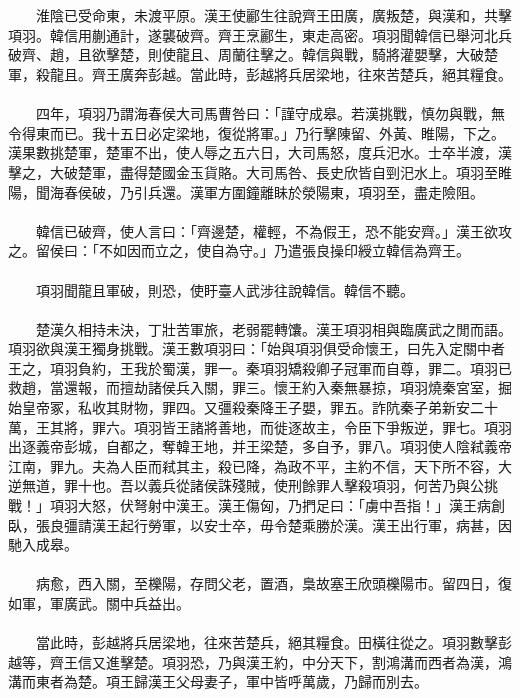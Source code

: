 \\\\
　　淮陰已受命東，未渡平原。漢王使酈生往說齊王田廣，廣叛楚，與漢和，共擊項羽。韓信用蒯通計，遂襲破齊。齊王烹酈生，東走高密。項羽聞韓信已舉河北兵破齊、趙，且欲擊楚，則使龍且、周蘭往擊之。韓信與戰，騎將灌嬰擊，大破楚軍，殺龍且。齊王廣奔彭越。當此時，彭越將兵居梁地，往來苦楚兵，絕其糧食。
\\\\
　　四年，項羽乃謂海春侯大司馬曹咎曰：「謹守成皋。若漢挑戰，慎勿與戰，無令得東而已。我十五日必定梁地，復從將軍。」乃行擊陳留、外黃、睢陽，下之。漢果數挑楚軍，楚軍不出，使人辱之五六日，大司馬怒，度兵汜水。士卒半渡，漢擊之，大破楚軍，盡得楚國金玉貨賂。大司馬咎、長史欣皆自剄汜水上。項羽至睢陽，聞海春侯破，乃引兵還。漢軍方圍鐘離眛於滎陽東，項羽至，盡走險阻。
\\\\
　　韓信已破齊，使人言曰：「齊邊楚，權輕，不為假王，恐不能安齊。」漢王欲攻之。留侯曰：「不如因而立之，使自為守。」乃遣張良操印綬立韓信為齊王。
\\\\
　　項羽聞龍且軍破，則恐，使盱臺人武涉往說韓信。韓信不聽。
\\\\
　　楚漢久相持未決，丁壯苦軍旅，老弱罷轉馕。漢王項羽相與臨廣武之閒而語。項羽欲與漢王獨身挑戰。漢王數項羽曰：「始與項羽俱受命懷王，曰先入定關中者王之，項羽負約，王我於蜀漢，罪一。秦項羽矯殺卿子冠軍而自尊，罪二。項羽已救趙，當還報，而擅劫諸侯兵入關，罪三。懷王約入秦無暴掠，項羽燒秦宮室，掘始皇帝冢，私收其財物，罪四。又彊殺秦降王子嬰，罪五。詐阬秦子弟新安二十萬，王其將，罪六。項羽皆王諸將善地，而徙逐故主，令臣下爭叛逆，罪七。項羽出逐義帝彭城，自都之，奪韓王地，并王梁楚，多自予，罪八。項羽使人陰弒義帝江南，罪九。夫為人臣而弒其主，殺已降，為政不平，主約不信，天下所不容，大逆無道，罪十也。吾以義兵從諸侯誅殘賊，使刑餘罪人擊殺項羽，何苦乃與公挑戰！」項羽大怒，伏弩射中漢王。漢王傷匈，乃捫足曰：「虜中吾指！」漢王病創臥，張良彊請漢王起行勞軍，以安士卒，毋令楚乘勝於漢。漢王出行軍，病甚，因馳入成皋。
\\\\
　　病愈，西入關，至櫟陽，存問父老，置酒，梟故塞王欣頭櫟陽市。留四日，復如軍，軍廣武。關中兵益出。
\\\\
　　當此時，彭越將兵居梁地，往來苦楚兵，絕其糧食。田橫往從之。項羽數擊彭越等，齊王信又進擊楚。項羽恐，乃與漢王約，中分天下，割鴻溝而西者為漢，鴻溝而東者為楚。項王歸漢王父母妻子，軍中皆呼萬歲，乃歸而別去。
\\\\
